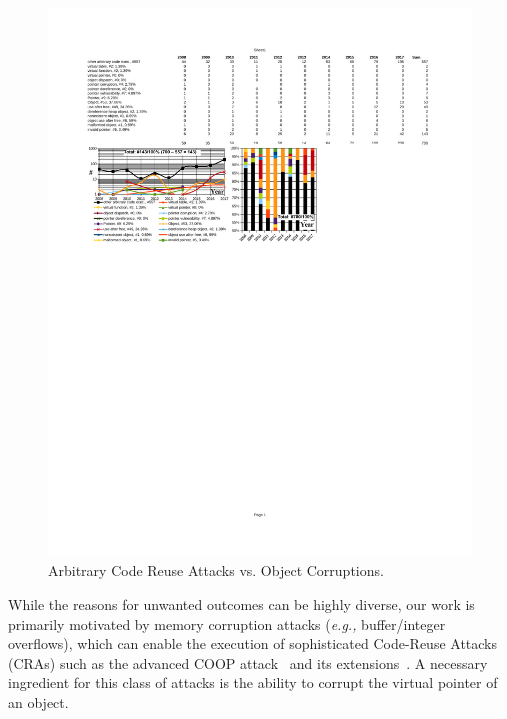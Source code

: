 \begin{figure}[t!]
\centering
\hspace{-.24cm}
  \includegraphics[scale=0.74]{figures/distri.pdf}
\caption{Arbitrary Code Reuse Attacks vs. Object Corruptions.}
\label{ace:nvd:statistics}
\vspace{-.5cm}
\end{figure}

While the reasons for unwanted outcomes can be highly diverse, our work is primarily motivated by memory corruption attacks (\textit{e.g.,} buffer/integer overflows), which can enable the 
execution of sophisticated Code-Reuse Attacks (CRAs) such as the advanced COOP attack~\cite{schuster:coop} and its 
extensions~\cite{crane:readactor++, subversive-c:lettner, ctf:coop, loop:oriented}. A necessary ingredient for this class of attacks is the ability
to corrupt the virtual pointer of an object.

